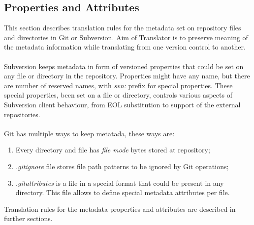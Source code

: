 \subsection{Properties and Attributes}
This section describes translation rules for the metadata set on repository files and directories in Git or Subversion.
Aim of Translator is to preserve meaning of the metadata information while translating from one version control 
to another.
\\\\
Subversion keeps metadata in form of versioned properties that could be set on any file or directory in the repository.
Properties might have any name, but there are number of reserved names, with \emph{svn:} prefix for special properties. 
These special properties, been set on a file or directory, controls various aspects of Subversion client behaviour, 
from EOL substitution to support of the external repositories.
\\\\
Git has multiple ways to keep metatada, these ways are:
\begin{enumerate}
\compactlist
\item Every directory and file has \emph{file mode} bytes stored at repository;
\item \emph{.gitignore} file stores file path patterns to be ignored by Git operations;
\item \emph{.gitattributes} is a file in a special format that could be present in any directory.
This file allows to define special metadata attributes per file.
\end{enumerate}

Translation rules for the metadata properties and attributes are described in further sections.

